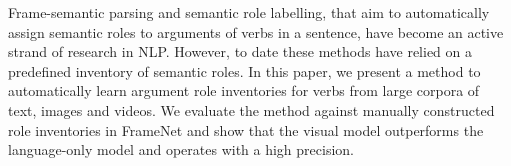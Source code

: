 Frame-semantic parsing and semantic role labelling, that aim to automatically assign semantic roles to arguments of verbs in a sentence, have become an active strand of research in NLP. However, to date these methods have relied on a predefined inventory of semantic roles. In this paper, we present a method to automatically learn argument role inventories for verbs from large corpora of text, images and videos. We evaluate the method against manually constructed role inventories in FrameNet and show that the visual model outperforms the language-only model and operates with a high precision.
